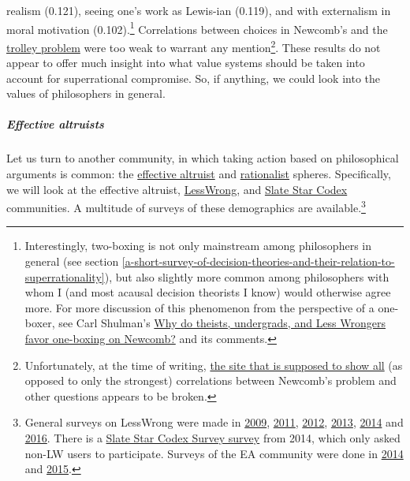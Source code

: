 realism (0.121), seeing one's work as Lewis-ian (0.119), and with
externalism in moral motivation (0.102).\footnote{Interestingly,
  two-boxing is not only mainstream among philosophers in general (see
  section
  \ref{a-short-survey-of-decision-theories-and-their-relation-to-superrationality}), but also slightly more common among
  philosophers with whom I (and most acausal decision theorists I know)
  would otherwise agree more. For more discussion of this phenomenon
  from the perspective of a one-boxer, see Carl Shulman's
  \href{http://lesswrong.com/lw/hqs/why_do_theists_undergrads_and_less_wrongers_favor/}{Why
  do theists, undergrads, and Less Wrongers favor one-boxing on
  Newcomb?} and its comments.} Correlations between choices in
Newcomb's and the
\href{https://en.wikipedia.org/wiki/Trolley_problem}{trolley
problem} were too weak to warrant any mention\footnote{Unfortunately,
  at the time of writing,
  \href{http://philpapers.org/surveys/linear_most_with.pl?A=main\%3ANewcomb\&flip=on\#main}{the
  site that is supposed to show all} (as opposed to only the strongest)
  correlations between Newcomb's problem and other questions appears to
  be broken.}. These results do not appear to offer much insight into
what value systems should be taken into account for superrational
compromise. So, if anything, we could look into the values of philosophers in general.

\hypertarget{effective-altruists}{\subparagraph{Effective
altruists}\label{effective-altruists}}

Let us turn to another community, in which taking action based on
philosophical arguments is common: the
\href{https://en.wikipedia.org/wiki/Effective_altruismhttps://en.wikipedia.org/wiki/Effective_altruism}{effective
altruist} and
\href{http://slatestarcodex.com/2014/09/05/mapmaker-mapmaker-make-me-a-map/}{rationalist}
spheres. Specifically, we will look at the effective altruist,
\href{https://en.wikipedia.org/wiki/LessWrong}{LessWrong}, and
\href{http://slatestarcodex.com/}{Slate Star Codex} communities.
A multitude of surveys of these demographics are available.\footnote{General
  surveys on LessWrong were made in
  \href{http://lesswrong.com/lw/fk/survey_results/}{2009},
  \href{http://lesswrong.com/lw/8p4/2011_survey_results/}{2011},
  \href{http://lesswrong.com/lw/fp5/2012_survey_results/}{2012},
  \href{http://lesswrong.com/lw/jj0/2013_survey_results/}{2013},
  \href{http://lesswrong.com/lw/lhg/2014_survey_results/}{2014}
  and
  \href{http://lesswrong.com/lw/nkw/2016_lesswrong_diaspora_survey_results/}{2016}.
  There is a
  \href{http://slatestarcodex.com/2015/11/04/2014-ssc-survey-results/}{Slate
  Star Codex Survey survey} from 2014, which only asked non-LW users to
  participate. Surveys of the EA community were done in
  \href{https://webcache.googleusercontent.com/search?q=cache:nmlsoMrw1JMJ:https://eahub.org/sites/effectivealtruismhub.com/files/survey/2014/results-and-analysis.pdf+\&cd=1\&hl=en\&ct=clnk\&gl=de}{2014}
  and
  \href{https://eahub.org/sites/eahub.org/files/SurveyReport2015.pdf}{2015}.}

